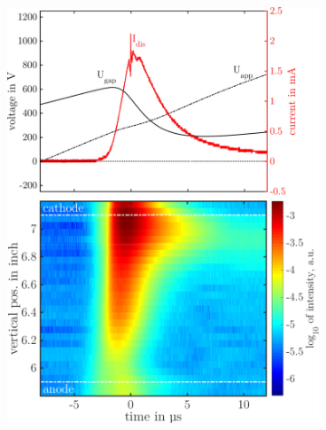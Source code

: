 \documentclass[a4paper,10pt,twoside]{article}
\begin{document}
				\begin{figure}
					\centering
					\begin{subfigure}[t]{0.49\textwidth}
						\includegraphics[width=\textwidth]{figures/706nm@sine/combination.pdf}
						\caption{}
						\label{img:combsine}
					\end{subfigure}
					\hfill
					\begin{subfigure}[t]{0.49\textwidth}

\end{subfigure}
\end{figure}
\end{document}
